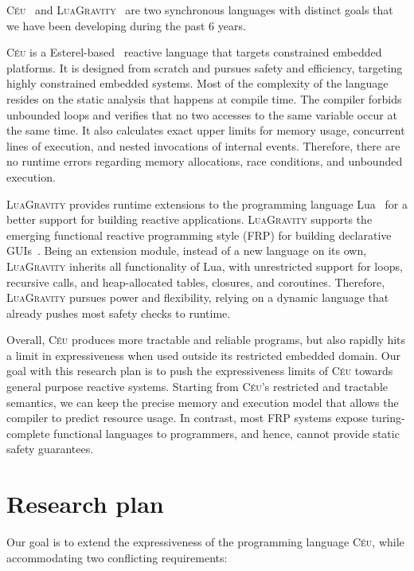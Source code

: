\documentclass[pdftex,12pt,a4paper]{article}
\newcommand{\CEU}{\textsc{C\'{e}u}\xspace}
\newcommand{\GVT}{\textsc{LuaGravity}\xspace}
\begin{document}
\CEU~\cite{ceu.tr,ceu.phd,ceu.sensys13,ceu.rem13}
and
\GVT~\cite{luagravity.sblp,luagravity.msc}
are two synchronous languages with distinct goals that we have been developing 
during the past 6 years.

\CEU is a Esterel-based~\cite{esterel.ieee91} reactive language that targets 
constrained embedded platforms.
It is designed from scratch and pursues safety and efficiency, targeting highly 
constrained embedded systems.
Most of the complexity of the language resides on the static analysis that 
happens at compile time.
The compiler forbids unbounded loops and verifies that no two accesses to the 
same variable occur at the same time.
It also calculates exact upper limits for memory usage, concurrent lines of 
execution, and nested invocations of internal events.
Therefore, there are no runtime errors regarding memory allocations, race 
conditions, and unbounded execution.

\GVT provides runtime extensions to the programming language Lua~\cite{lua.pil} 
for a better support for building reactive applications.
\GVT supports the emerging functional reactive programming style (FRP) for 
building declarative GUIs~\cite{frp.flapjax,frp.elm,frp.survey}.
Being an extension module, instead of a new language on its own, \GVT inherits 
all functionality of Lua, with unrestricted support for loops, recursive calls, 
and heap-allocated tables, closures, and coroutines.
Therefore, \GVT pursues power and flexibility, relying on a dynamic language 
that already pushes most safety checks to runtime.

Overall, \CEU produces more tractable and reliable programs, but also rapidly 
hits a limit in expressiveness when used outside its restricted embedded 
domain.
%
Our goal with this research plan is to push the expressiveness limits of \CEU 
towards general purpose reactive systems.
%
Starting from \CEU's restricted and tractable semantics, we can keep the 
precise memory and execution model that allows the compiler to predict resource 
usage.
%
In contrast, most FRP systems expose turing-complete functional languages to 
programmers, and hence, cannot provide static safety guarantees.

\section{Research plan}

Our goal is to extend the expressiveness of the programming language \CEU, 
while accommodating two conflicting requirements:
\end{document}
